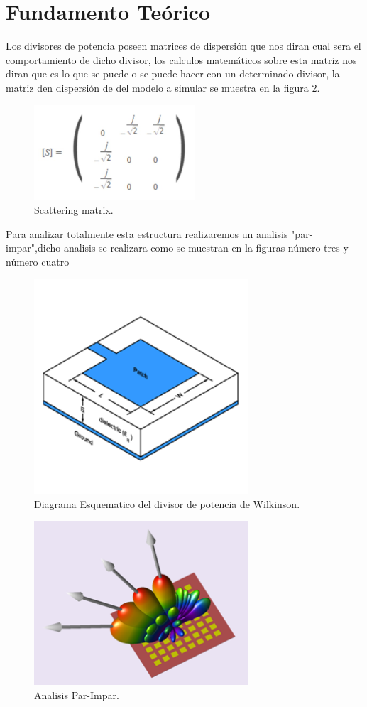 \documentclass[a4paper]{IEEEtran} %
\begin{document}
\section{Fundamento Teórico}
Los divisores de potencia poseen matrices de dispersión que nos diran cual sera el comportamiento de dicho divisor, los calculos matemáticos sobre esta matriz nos diran que es lo que se puede o se puede hacer con un determinado divisor, la matriz den dispersión de del modelo a simular se muestra en la figura 2.\\
\begin{figure}[h]
    \centering
        \includegraphics[width=6cm]{imagenes/img1}
        \caption{Scattering matrix.}
        \label{fig.}
\end{figure}
Para analizar totalmente esta estructura realizaremos un analisis "par-impar",dicho analisis se realizara como se muestran en la figuras número tres y número cuatro 
\begin{figure}[h]
    \centering
        \includegraphics[width=8cm]{imagenes/img3}
        \caption{Diagrama Esquematico del divisor de potencia de Wilkinson.}
        \label{fig.}
\end{figure}
\begin{figure}[h]
    \centering
        \includegraphics[width=8cm]{imagenes/img4}
        \caption{Analisis Par-Impar.}
        \label{fig.}
\end{figure}
\end{document}
